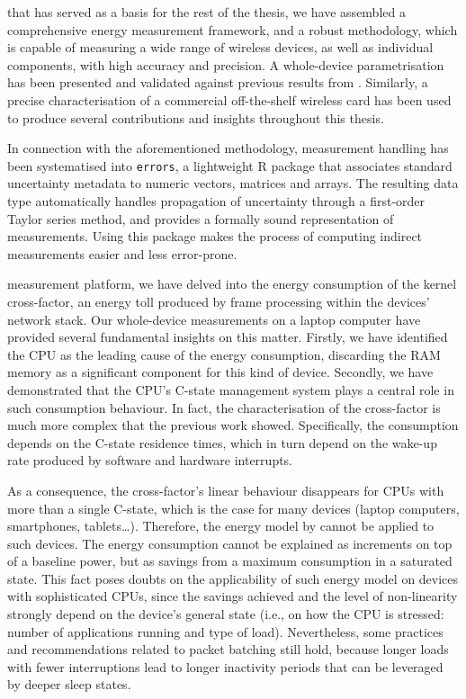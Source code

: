 \documentclass[twoside,nohyper]{tufte-book}
\begin{document}
 that has served as a basis for the rest of the thesis, we have assembled a comprehensive energy measurement framework, and a robust methodology, which is capable of measuring a wide range of wireless devices, as well as individual components, with high accuracy and precision. A whole-device parametrisation has been presented and validated against previous results from \citet{Serrano2014}. Similarly, a precise characterisation of a commercial off-the-shelf wireless card has been used to produce several contributions and insights throughout this thesis.

In connection with the aforementioned methodology, measurement handling has been systematised into \texttt{errors}\cite[0pt]{contrib-03}, a lightweight R package that associates standard uncertainty metadata to numeric vectors, matrices and arrays. The resulting data type automatically handles propagation of uncertainty through a first-order Taylor series method, and provides a formally sound representation of measurements. Using this package makes the process of computing indirect measurements easier and less error-prone.

 measurement platform, we have delved into the energy consumption of the kernel cross-factor, an energy toll produced by frame processing within the devices' network stack. Our whole-device measurements on a laptop computer have provided several fundamental insights\cite[-.9in]{contrib-04a,contrib-04b} on this matter. Firstly, we have identified the CPU as the leading cause of the energy consumption, discarding the RAM memory as a significant component for this kind of device. Secondly, we have demonstrated that the CPU's C-state management system plays a central role in such consumption behaviour. In fact, the characterisation of the cross-factor is much more complex that the previous work showed. Specifically, the consumption depends on the C-state residence times, which in turn depend on the wake-up rate produced by software and hardware interrupts.

As a consequence, the cross-factor's linear behaviour disappears for CPUs with more than a single C-state, which is the case for many devices (laptop computers, smartphones, tablets\ldots{}). Therefore, the energy model by \citet{Serrano2014} cannot be applied to such devices. The energy consumption cannot be explained as increments on top of a baseline power, but as savings from a maximum consumption in a saturated state. This fact poses doubts on the applicability of such energy model on devices with sophisticated CPUs, since the savings achieved and the level of non-linearity strongly depend on the device's general state (i.e., on how the CPU is stressed: number of applications running and type of load). Nevertheless, some practices and recommendations related to packet batching still hold, because longer loads with fewer interruptions lead to longer inactivity periods that can be leveraged by deeper sleep states.
\end{document}
